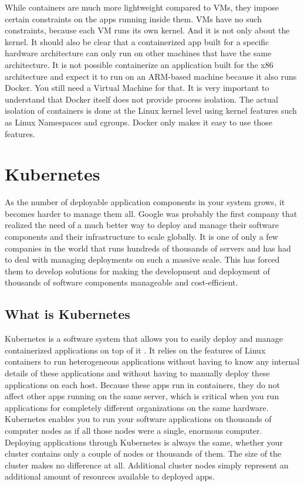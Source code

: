 While containers are much more lightweight compared to VMs, they impose certain constraints on the apps running inside them. VMs have no such constraints, because each VM runs its own kernel.
And it is not only about the kernel. It should also be clear that a containerized app built for a specific hardware architecture can only run on other machines that have the same architecture. It is not possible containerize an application built for the x86 architecture and expect it to run on an ARM-based machine because it also runs Docker. You still need a Virtual Machine for that.
It is very important to understand that Docker itself does not provide process isolation. The actual isolation of containers is done at the Linux kernel level using kernel features such as Linux Namespaces and cgroups. Docker only makes it easy to use those features.


\section{Kubernetes} \label{sec:kubernetesbackground}
As the number of deployable application components in your system grows, it becomes harder to manage them all. Google was probably the first company that realized the need of a much better way to deploy and manage their software components and their infrastructure to scale globally. It is one of only a few companies in the world that runs hundreds of thousands of servers and has had to deal with managing deployments on such a massive scale. This has forced them to develop solutions for making the development and deployment of thousands of software components manageable and cost-efficient.


\subsection{What is Kubernetes}
Kubernetes is a software system that allows you to easily deploy and manage containerized applications on top of it \cite{kubernetesbook}. It relies on the features of Linux containers to run heterogeneous applications without having to know any internal details of these applications and without having to manually deploy these applications on each host. Because these apps run in containers, they do not affect other apps running on the same server, which is critical when you run applications for completely different organizations on the same hardware.
Kubernetes enables you to run your software applications on thousands of computer nodes as if all those nodes were a single, enormous computer.
Deploying applications through Kubernetes is always the same, whether your cluster contains only a couple of nodes or thousands of them. The size of the cluster makes no difference at all. Additional cluster nodes simply represent an additional amount of resources available to deployed apps.

